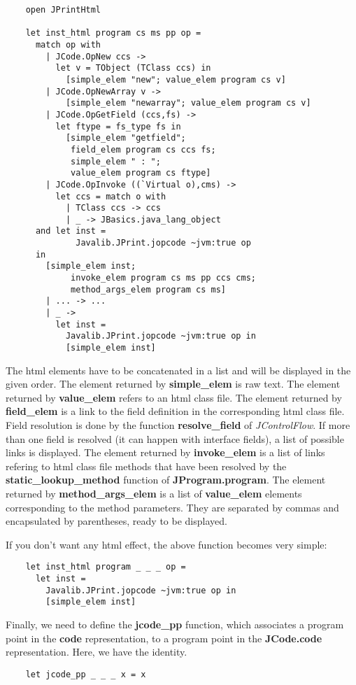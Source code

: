 \documentclass{article}
\begin{document}
\begin{verbatim}
    open JPrintHtml

    let inst_html program cs ms pp op =
      match op with
        | JCode.OpNew ccs ->
          let v = TObject (TClass ccs) in
            [simple_elem "new"; value_elem program cs v]
        | JCode.OpNewArray v ->
            [simple_elem "newarray"; value_elem program cs v]
        | JCode.OpGetField (ccs,fs) ->
          let ftype = fs_type fs in
            [simple_elem "getfield";
             field_elem program cs ccs fs;
             simple_elem " : ";
             value_elem program cs ftype]
        | JCode.OpInvoke ((`Virtual o),cms) ->
          let ccs = match o with
            | TClass ccs -> ccs
            | _ -> JBasics.java_lang_object 
      and let inst =
              Javalib.JPrint.jopcode ~jvm:true op 
      in
        [simple_elem inst;
             invoke_elem program cs ms pp ccs cms;
             method_args_elem program cs ms]
        | ... -> ...
        | _ ->
          let inst =
            Javalib.JPrint.jopcode ~jvm:true op in
            [simple_elem inst]
\end{verbatim}
The html elements have to be concatenated in a list and will be
displayed in the given order. The element returned by
\textbf{simple\_elem} is raw text. The element returned by
\textbf{value\_elem} refers to an html class file. The element
returned by \textbf{field\_elem} is a link to the field definition
in the corresponding html class file. Field resolution is done by
the function \textbf{resolve\_field} of \emph{JControlFlow}. If
more than one field is resolved (it can happen with interface
fields), a list of possible links is displayed. The element
returned by \textbf{invoke\_elem} is a list of links refering to
html class file methods that have been resolved by the
\textbf{static\_lookup\_method} function of
\textbf{JProgram.program}. The element returned by
\textbf{method\_args\_elem} is a list of \textbf{value\_elem}
elements corresponding to the method parameters. They are separated
by commas and encapsulated by parentheses, ready to be displayed.

If you don't want any html effect, the above function becomes very
simple:

\begin{verbatim}
    let inst_html program _ _ _ op =
      let inst =
        Javalib.JPrint.jopcode ~jvm:true op in
        [simple_elem inst]
\end{verbatim}
Finally, we need to define the \textbf{jcode\_pp} function, which
associates a program point in the \textbf{code} representation, to
a program point in the \textbf{JCode.code} representation. Here, we
have the identity.

\begin{verbatim}
    let jcode_pp _ _ _ x = x
\end{verbatim}
\end{document}
